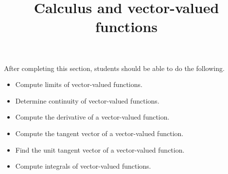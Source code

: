 \documentclass{ximera}
\title{Calculus and vector-valued functions}
\begin{document}
\begin{abstract}
\end{abstract}

\maketitle

\begin{sectionOutcomes}

After completing this section, students should be able to do the following.

\begin{itemize}
\item Compute limits of vector-valued functions.
\item Determine continuity of vector-valued functions. 
\item Compute the derivative of a vector-valued function. 
\item Compute the tangent vector of a vector-valued function.
\item Find the unit tangent vector of a vector-valued function.
\item Compute integrals of vector-valued functions.
\end{itemize}

\end{sectionOutcomes}
\end{document}
